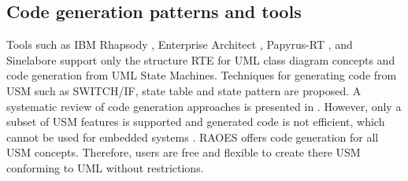 \subsection{Code generation patterns and tools}
Tools such as IBM Rhapsody \cite{ibm_rhapsody}, Enterprise Architect \cite{EA}, Papyrus-RT \cite{possepapyrusrt}, and Sinelabore \cite{sinelabore} support only the structure RTE for UML class diagram concepts and code generation from UML State Machines.
Techniques for generating code from USM such as SWITCH/IF, state table \cite{Douglass1999} and state pattern \cite{Shalyto2006,niaz_mapping_2004} are proposed. 
A systematic review of code generation approaches is presented in \cite{Domnguez2012}.
However, only a subset of USM features is supported and generated code is not efficient, %
which cannot be used for embedded systems \cite{spinke_object-oriented_2013}.
RAOES offers code generation for all USM concepts. %
Therefore, users are free and flexible to create there USM conforming to UML without restrictions.